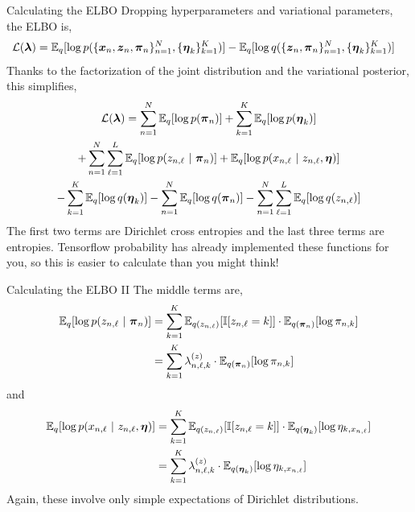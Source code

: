 \documentclass[aspectratio=169]{beamer}
\begin{document}
\begin{frame}{Calculating the ELBO}
Dropping hyperparameters and variational parameters, the ELBO is,
\begin{align}
    \mathcal{L}(\boldsymbol{\lambda}) &= \mathbb{E}_{q}[\log p(\{\boldsymbol{x}_n, \boldsymbol{z}_n, \boldsymbol{\pi}_n\}_{n=1}^N, \{\boldsymbol{\eta}_k\}_{k=1}^K)] - \mathbb{E}_q[\log q(\{\boldsymbol{z}_n, \boldsymbol{\pi}_n\}_{n=1}^N, \{\boldsymbol{\eta}_k\}_{k=1}^K)] 
\end{align}
Thanks to the factorization of the joint distribution and the variational posterior, this simplifies,
\begin{multline}
    \mathcal{L}(\boldsymbol{\lambda}) = \sum_{n=1}^N \mathbb{E}_{q}[\log p(\boldsymbol{\pi}_n)] + \sum_{k=1}^K \mathbb{E}_q[\log p(\boldsymbol{\eta}_k)] \\
    + \sum_{n=1}^N \sum_{\ell=1}^L \mathbb{E}_q[\log p(z_{n,\ell} ~\vert~ \boldsymbol{\pi}_n)] + \mathbb{E}_q[\log p(x_{n, \ell} ~\vert~ z_{n,\ell}, \boldsymbol{\eta})] \\
    -\sum_{k=1}^K \mathbb{E}_q[\log q(\boldsymbol{\eta}_k)] - \sum_{n=1}^N \mathbb{E}_q[\log q(\boldsymbol{\pi}_n)]
    -\sum_{n=1}^N \sum_{\ell=1}^L \mathbb{E}_q[\log q(z_{n, \ell})]
\end{multline}
The first two terms are Dirichlet cross entropies and the last three terms are entropies. Tensorflow probability has already implemented these functions for you, so this is easier to calculate than you might think!
\end{frame}

\begin{frame}{Calculating the ELBO II}
The middle terms are,
\begin{align}
    \mathbb{E}_q[\log p(z_{n,\ell} ~\vert~ \boldsymbol{\pi}_n)] 
    &= \sum_{k=1}^K \mathbb{E}_{q(z_{n,\ell})}[\mathbb{I}[z_{n,\ell}=k]] \cdot \mathbb{E}_{q(\boldsymbol{\pi}_n)} [\log \pi_{n,k}] \\
    &= \sum_{k=1}^K \lambda_{n,\ell,k}^{(z)} \cdot \mathbb{E}_{q(\boldsymbol{\pi}_n)} [\log \pi_{n,k}]
\end{align}
and
\begin{align}
    \mathbb{E}_q[\log p(x_{n, \ell} ~\vert~ z_{n,\ell}, \boldsymbol{\eta})] 
    &= \sum_{k=1}^K \mathbb{E}_{q(z_{n,\ell})}[\mathbb{I}[z_{n,\ell}=k]] \cdot \mathbb{E}_{q(\boldsymbol{\eta}_k)} [\log \eta_{k,x_{n,\ell}}] \\
    &= \sum_{k=1}^K \lambda_{n,\ell,k}^{(z)} \cdot \mathbb{E}_{q(\boldsymbol{\eta}_k)} [\log \eta_{k,x_{n,\ell}}] 
\end{align}
Again, these involve only simple expectations of Dirichlet distributions.
\end{frame}
\end{document}
